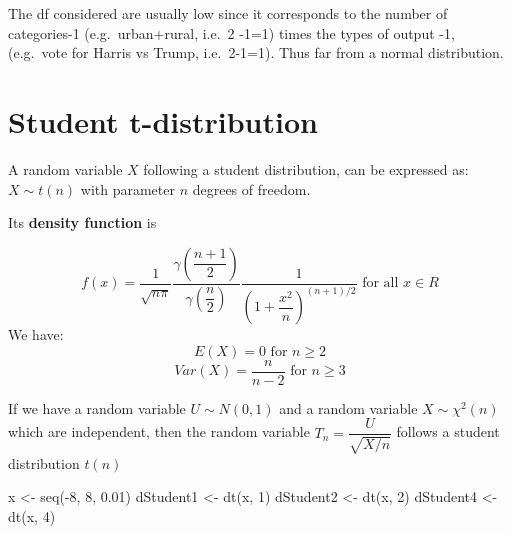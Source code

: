 \documentclass[
  letterpaper,
  DIV=11,
  numbers=noendperiod]{scrreprt}
\newenvironment{Shaded}{\begin{snugshade}}{\end{snugshade}}
\newcommand{\DecValTok}[1]{\textcolor[rgb]{0.68,0.00,0.00}{#1}}
\newcommand{\FloatTok}[1]{\textcolor[rgb]{0.68,0.00,0.00}{#1}}
\newcommand{\FunctionTok}[1]{\textcolor[rgb]{0.28,0.35,0.67}{#1}}
\newcommand{\NormalTok}[1]{\textcolor[rgb]{0.00,0.23,0.31}{#1}}
\newcommand{\OtherTok}[1]{\textcolor[rgb]{0.00,0.23,0.31}{#1}}
\newcommand{\SpecialCharTok}[1]{\textcolor[rgb]{0.37,0.37,0.37}{#1}}
\begin{document}
The df considered are usually low since it corresponds to the number of
categories-1 (e.g.~urban+rural, i.e.~2 -1=1) times the types of output
-1, (e.g.~vote for Harris vs Trump, i.e.~2-1=1). Thus far from a normal
distribution.

\section{Student t-distribution}\label{student-t-distribution}

A random variable \(X\) following a student distribution, can be
expressed as: \(X \sim t(n)\) with parameter \(n\) degrees of freedom.

Its \textbf{density function} is

\[f(x) = \dfrac{1}{\sqrt{n\pi}} \dfrac {\gamma{(\dfrac{n+1}{2})}} {\gamma{(\dfrac{n}{2})}} \dfrac {1} {(1+\dfrac{x^2}{n})^{(n+1)/2}} \text{ for all } x\in R\]
We have: \[E(X) = 0 \text{ for } n \ge 2\]
\[Var(X) = \dfrac{n}{n-2} \text{ for } n \ge 3\]

If we have a random variable \(U \sim N (0, 1)\) and a random variable
\(X \sim \chi^2(n)\) which are independent, then the random variable
\(T_n = \dfrac{U}{\sqrt{X/n}}\) follows a student distribution \(t(n)\)

\begin{Shaded}
\begin{Highlighting}[]
\NormalTok{x }\OtherTok{\textless{}{-}} \FunctionTok{seq}\NormalTok{(}\SpecialCharTok{{-}}\DecValTok{8}\NormalTok{, }\DecValTok{8}\NormalTok{, }\FloatTok{0.01}\NormalTok{)}
\NormalTok{dStudent1 }\OtherTok{\textless{}{-}} \FunctionTok{dt}\NormalTok{(x, }\DecValTok{1}\NormalTok{)}
\NormalTok{dStudent2 }\OtherTok{\textless{}{-}} \FunctionTok{dt}\NormalTok{(x, }\DecValTok{2}\NormalTok{)}
\NormalTok{dStudent4 }\OtherTok{\textless{}{-}} \FunctionTok{dt}\NormalTok{(x, }\DecValTok{4}\NormalTok{)}
\end{Highlighting}
\end{Shaded}
\end{document}
